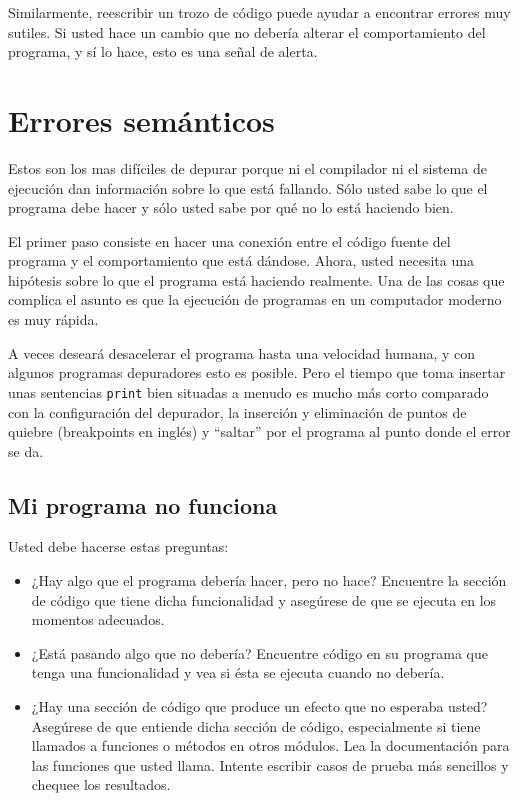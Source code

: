 Similarmente, reescribir un trozo de código puede ayudar a encontrar
errores muy sutiles. Si usted hace un cambio que no debería alterar
el comportamiento del programa, y sí lo hace, esto es una señal
de alerta.


\section{Errores semánticos}

Estos son los mas difíciles de depurar porque ni el compilador
ni el sistema de ejecución dan información sobre lo que está
fallando. Sólo usted sabe lo que el programa debe hacer y 
sólo usted sabe por qué no lo está haciendo bien.

El primer paso consiste en hacer una conexión entre el código
fuente del programa y el comportamiento que está dándose.
Ahora, usted necesita una hipótesis sobre lo que el programa
está haciendo realmente. Una de las cosas que complica el 
asunto es que la ejecución de programas en un computador
moderno es muy rápida.

A veces deseará desacelerar el programa hasta una velocidad
humana, y con algunos programas depuradores esto es posible.
Pero el tiempo que toma insertar unas sentencias \texttt{print}
bien situadas a menudo es mucho más corto comparado con la
configuración del depurador, la inserción y eliminación de
puntos de quiebre (breakpoints en inglés) y ``saltar'' por
el programa al punto donde el error se da.

\subsection{Mi programa no funciona}

Usted debe hacerse estas preguntas:

\begin{itemize}

\item ¿Hay algo que el programa debería hacer, pero no hace?
Encuentre la sección de código que tiene dicha funcionalidad
y asegúrese de que se ejecuta en los momentos adecuados.

\item ¿Está pasando algo que no debería? Encuentre código en 
su programa que tenga una funcionalidad y vea si ésta se 
ejecuta cuando no debería.

\item ¿Hay una sección de código que produce un efecto que
no esperaba usted? Asegúrese de que entiende dicha
sección de código, especialmente si tiene llamados a funciones
o métodos en otros módulos. Lea la documentación para las
funciones que usted llama. Intente escribir casos de prueba
más sencillos y chequee los resultados.

\end{itemize}

